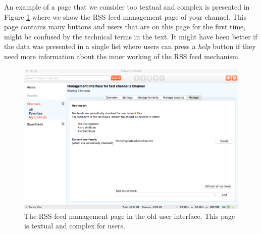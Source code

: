 An example of a page that we consider too textual and complex is presented in Figure \ref{fig:old-interface-rss-page} where we show the RSS feed management page of your channel. This page contains many buttons and users that are on this page for the first time, might be confused by the technical terms in the text. It might have been better if the data was presented in a single list where users can press a \emph{help} button if they need more information about the inner working of the RSS feed mechanism.\\

\begin{figure}[t]
	\centering
	\includegraphics[width=1.0\columnwidth]{images/implementation/old_gui}
	\caption{The RSS-feed management page in the old user interface. This page is textual and complex for users.}
	\label{fig:old-interface-rss-page}
\end{figure}

